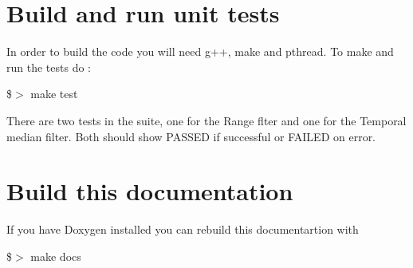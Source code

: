 \hypertarget{index_build_test_sec}{}\section{Build and run unit tests}\label{index_build_test_sec}
In order to build the code you will need g++, make and pthread. To make and run the tests do \+:

\$$>$ make test

There are two tests in the suite, one for the Range flter and one for the Temporal median filter. Both should show \textquotesingle{}P\+A\+S\+S\+ED\textquotesingle{} if successful or \textquotesingle{}F\+A\+I\+L\+ED\textquotesingle{} on error.\hypertarget{index_build_docs_sec}{}\section{Build this documentation}\label{index_build_docs_sec}
If you have Doxygen installed you can rebuild this documentartion with

\$$>$ make docs

